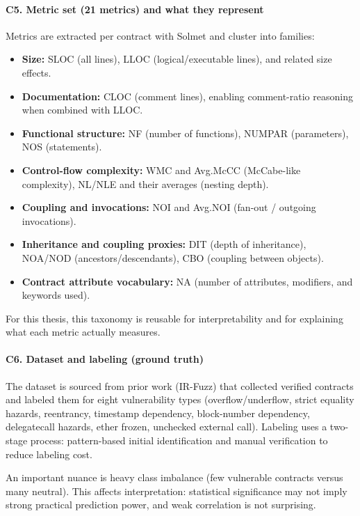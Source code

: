 \documentclass[11pt,a4paper]{article}
\begin{document}
\paragraph{C5. Metric set (21 metrics) and what they represent}
Metrics are extracted per contract with Solmet and cluster into families:
\begin{itemize}[leftmargin=*]
  \item \textbf{Size:} SLOC (all lines), LLOC (logical/executable lines), and related size effects.
  \item \textbf{Documentation:} CLOC (comment lines), enabling comment-ratio reasoning when combined with LLOC.
  \item \textbf{Functional structure:} NF (number of functions), NUMPAR (parameters), NOS (statements).
  \item \textbf{Control-flow complexity:} WMC and Avg.McCC (McCabe-like complexity), NL/NLE and their averages (nesting depth).
  \item \textbf{Coupling and invocations:} NOI and Avg.NOI (fan-out / outgoing invocations).
  \item \textbf{Inheritance and coupling proxies:} DIT (depth of inheritance), NOA/NOD (ancestors/descendants), CBO (coupling between objects).
  \item \textbf{Contract attribute vocabulary:} NA (number of attributes, modifiers, and keywords used).
\end{itemize}
For this thesis, this taxonomy is reusable for interpretability and for explaining what each metric actually measures.

\paragraph{C6. Dataset and labeling (ground truth)}
The dataset is sourced from prior work (IR-Fuzz) that collected verified contracts and labeled them for eight vulnerability types (overflow/underflow, strict equality hazards, reentrancy, timestamp dependency, block-number dependency, delegatecall hazards, ether frozen, unchecked external call). Labeling uses a two-stage process: pattern-based initial identification and manual verification to reduce labeling cost.

An important nuance is heavy class imbalance (few vulnerable contracts versus many neutral). This affects interpretation: statistical significance may not imply strong practical prediction power, and weak correlation is not surprising.
\end{document}
